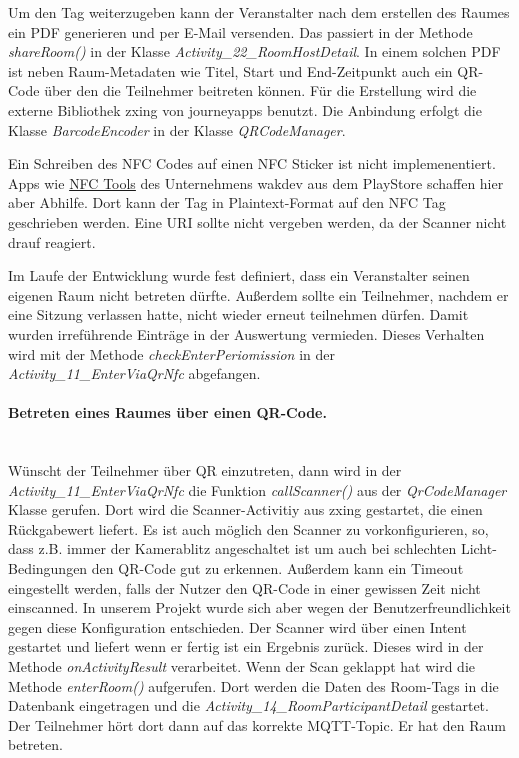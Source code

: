 Um den Tag weiterzugeben kann der Veranstalter nach dem erstellen des Raumes ein PDF generieren und per E-Mail versenden. 
Das passiert in der Methode \textit{shareRoom()} in der Klasse \textit{Activity\_22\_RoomHostDetail}. 
In einem solchen PDF ist neben Raum-Metadaten wie Titel, Start und End-Zeitpunkt auch ein QR-Code über den die Teilnehmer beitreten können. 
Für die Erstellung wird die externe Bibliothek zxing von journeyapps benutzt. Die Anbindung erfolgt die Klasse \textit{BarcodeEncoder} in der Klasse \textit{QRCodeManager}.

Ein Schreiben des NFC Codes auf einen NFC Sticker ist nicht implemenentiert.
 Apps wie \href{https://play.google.com/store/apps/details?id=com.wakdev.wdnfc&hl=de&gl=US}{NFC Tools} des Unternehmens wakdev aus dem PlayStore schaffen hier aber Abhilfe. Dort kann der Tag in Plaintext-Format auf den NFC Tag geschrieben werden.
Eine URI sollte nicht vergeben werden, da der Scanner nicht drauf reagiert.

Im Laufe der Entwicklung  wurde fest definiert, dass ein Veranstalter seinen eigenen Raum nicht betreten dürfte.
 Außerdem sollte ein Teilnehmer, nachdem er eine Sitzung verlassen hatte, nicht wieder erneut teilnehmen dürfen. 
 Damit wurden irreführende Einträge in der Auswertung vermieden. Dieses Verhalten wird mit der Methode \textit{checkEnterPeriomission} in der \textit{Activity\_11\_EnterViaQrNfc} abgefangen.
 
\paragraph{Betreten eines Raumes über einen QR-Code.}\mbox{}\\
\label{paragraph:QR}
Wünscht der Teilnehmer über QR einzutreten, dann wird in der \textit{Activity\_11\_EnterViaQrNfc} die Funktion \textit{callScanner()} aus der \textit{QrCodeManager} Klasse gerufen. Dort wird die Scanner-Activitiy aus zxing gestartet, die einen Rückgabewert liefert. Es ist auch möglich den Scanner zu vorkonfigurieren, so, dass z.B. immer der Kamerablitz angeschaltet ist um auch bei schlechten Licht-Bedingungen den QR-Code gut zu erkennen. 
Außerdem kann ein Timeout eingestellt werden, falls der Nutzer den QR-Code in einer gewissen Zeit nicht einscanned.
In unserem Projekt wurde sich aber wegen der Benutzerfreundlichkeit gegen diese Konfiguration entschieden.
Der Scanner wird über einen Intent gestartet und liefert wenn er fertig ist ein Ergebnis zurück.
Dieses wird in der Methode \textit{onActivityResult} verarbeitet. Wenn der Scan geklappt hat wird die Methode \textit{enterRoom()} aufgerufen. Dort werden die Daten des Room-Tags in die Datenbank eingetragen und die \textit{Activity\_14\_RoomParticipantDetail} gestartet. Der Teilnehmer hört dort dann auf das korrekte MQTT-Topic. Er hat den Raum betreten.

